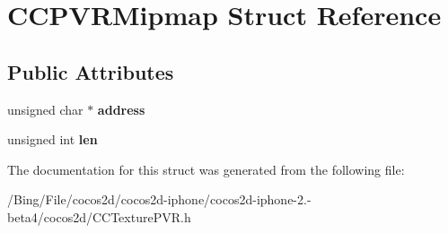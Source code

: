 \hypertarget{struct_c_c_p_v_r_mipmap}{\section{C\-C\-P\-V\-R\-Mipmap Struct Reference}
\label{struct_c_c_p_v_r_mipmap}
}
\subsection*{Public Attributes}
\begin{DoxyCompactItemize}
\item 
\hypertarget{struct_c_c_p_v_r_mipmap_adbddc53cf30976718bbf063027145437}{unsigned char $\ast$ {\bfseries address}}\label{struct_c_c_p_v_r_mipmap_adbddc53cf30976718bbf063027145437}

\item 
\hypertarget{struct_c_c_p_v_r_mipmap_aade36c5eccf59cafd6821b10e198c4ac}{unsigned int {\bfseries len}}\label{struct_c_c_p_v_r_mipmap_aade36c5eccf59cafd6821b10e198c4ac}

\end{DoxyCompactItemize}


The documentation for this struct was generated from the following file\-:\begin{DoxyCompactItemize}
\item 
/\-Bing/\-File/cocos2d/cocos2d-\/iphone/cocos2d-\/iphone-\/2.-\/beta4/cocos2d/C\-C\-Texture\-P\-V\-R.\-h\end{DoxyCompactItemize}
